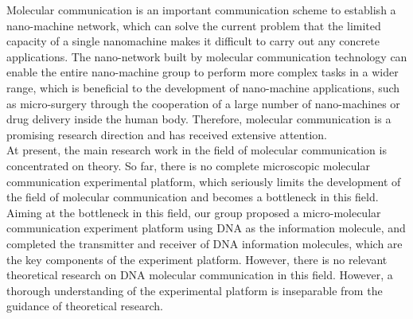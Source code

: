 
\begin{digest}
  Molecular communication is an important communication scheme to establish a nano-machine network, which can solve the current problem that the limited capacity of a single nanomachine makes it difficult to carry out any concrete applications. The nano-network built by molecular communication technology can enable the entire nano-machine group to perform more complex tasks in a wider range, which is beneficial to the development of nano-machine applications, such as micro-surgery through the cooperation of a large number of nano-machines or drug delivery inside the human body. Therefore, molecular communication is a promising research direction and has received extensive attention.\\

  At present, the main research work in the field of molecular communication is concentrated on theory. So far, there is no complete microscopic molecular communication experimental platform, which seriously limits the development of the field of molecular communication and becomes a bottleneck in this field. Aiming at the bottleneck in this field, our group proposed a micro-molecular communication experiment platform using DNA as the information molecule, and completed the transmitter and receiver of DNA information molecules, which are the key components of the experiment platform. However, there is no relevant theoretical research on DNA molecular communication in this field. However, a thorough understanding of the experimental platform is inseparable from the guidance of theoretical research.\\
  

\end{digest}
